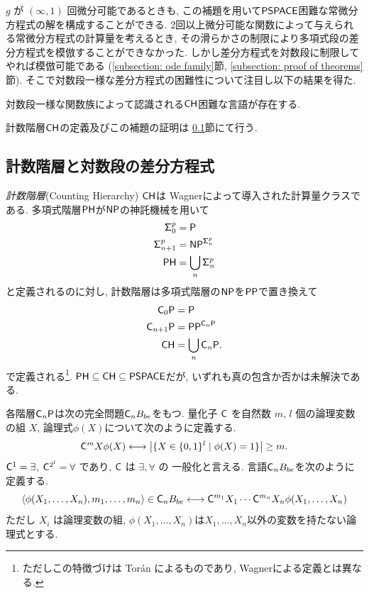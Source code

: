 $g$ が $(\infty, 1)$ 回微分可能であるときも,
この補題を用いて$\mathsf{PSPACE}$困難な常微分方程式の解を構成することができる.
2回以上微分可能な関数によって与えられる常微分方程式の計算量を考えるとき,
その滑らかさの制限により多項式段の差分方程式を模倣することができなかった.
しかし差分方程式を対数段に制限してやれば模倣可能である
(\ref{subsection: ode family}節, \ref{subsection: proof of theorems}節).
そこで対数段一様な差分方程式の困難性について注目し以下の結果を得た.
\begin{lemma}
 \label{DIVPlogIsCHhard}
 対数段一様な関数族によって認識される$\mathsf{CH}$困難な言語が存在する.
\end{lemma}
計数階層$\mathsf{CH}$の定義及びこの補題の証明は
\ref{subsection: counting hierarchy}節にて行う.

\subsection{計数階層と対数段の差分方程式}
\label{subsection: counting hierarchy}

\emph{計数階層}\kern\xkanjiskip(Counting Hierarchy) $\mathsf{CH}$は
Wagnerによって導入された計算量クラスである\cite{wagner1986complexity}.
多項式階層$\mathsf{PH}$が$\mathsf{NP}$の神託機械を用いて
\begin{align*}
 \mathsf{\Sigma}^p_0  &= \mathsf{P}
 \\
 \mathsf{\Sigma}^p_{n+1} &= \mathsf{NP} ^{\mathsf{\Sigma}^p_n}
 \\
 \mathsf{PH} &= \bigcup_n \mathsf{\Sigma}^p_n
\end{align*}
と定義されるのに対し,
計数階層は多項式階層の$\mathsf{NP}$を$\mathsf{PP}$で置き換えて
\begin{align*}
 \mathsf{C}_0 \mathsf{P}  &= \mathsf{P}
 \\
 \mathsf{C}_{n+1} \mathsf{P} &= \mathsf{PP}^{\mathsf{C}_n \mathsf{P}}
 \\
 \mathsf{CH} &= \bigcup_n \mathsf{C}_n \mathsf{P}.
\end{align*}
で定義される\footnote{ただしこの特徴づけは Tor{\'a}n によるものであり,
Wagnerによる定義とは異なる\cite{toran1991complexity}.
}. $\mathsf{PH} \subseteq \mathsf{CH} \subseteq \mathsf{PSPACE}$だが,
いずれも真の包含か否かは未解決である.

各階層$\mathsf{C}_n \mathsf{P}$は次の完全問題$\mathsf{C}_n B_{be}$をもつ.
量化子 $\mathsf{C}$ を自然数 $m$, $l$ 個の論理変数の組 $X$,
論理式$\phi(X)$について次のように定義する.
\begin{equation}
 \mathsf{C}^m X \phi(X) 
  \longleftrightarrow 
  \bigl|\{X \in \{0, 1\}^l \mid \phi(X) = 1\}\bigr| \ge m.
\end{equation}
$\mathsf{C}^1 = \exists$, $\mathsf{C}^{2^l} = \forall$ であり, $\mathsf{C}$ は $\exists, \forall$ の
一般化と言える.
言語$\mathsf{C}_n B_{be}$を次のように定義する.
\begin{equation}
 \langle \phi(X_1, \dots, X_n), m_1, \dots, m_n \rangle \in \mathsf{C}_n B_{be}
 \longleftrightarrow
 \mathsf{C}^{m_1}{X_1} \cdots \mathsf{C}^{m_n}{X_n} \phi(X_1, \dots, X_n) 
\end{equation}
ただし
$X_i$ は論理変数の組,
$\phi(X_1, \dots, X_n)$は$X_1, \dots, X_n$以外の変数を持たない論理式とする.

